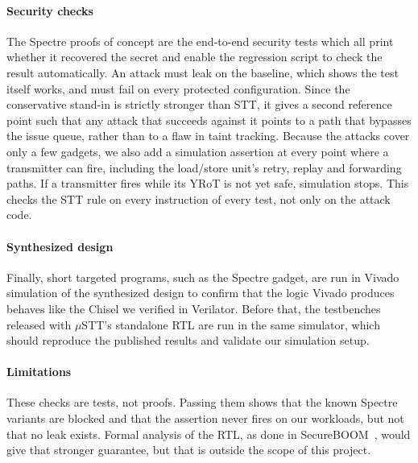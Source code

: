 \paragraph{Security checks}
The Spectre proofs of concept are the end-to-end security tests which all print
whether it recovered the secret and enable the regression script to check the
result automatically. An attack must leak on the baseline, which shows the
test itself works, and must fail on every protected configuration. Since the
conservative stand-in is strictly stronger than STT, it gives a second reference point 
such that any attack that succeeds against it points to a path that bypasses the issue queue, 
rather than to a flaw in taint tracking. Because the attacks cover only a few gadgets, 
we also add a simulation assertion at every point where a transmitter can fire, 
including the load/store unit's retry, replay and forwarding paths. If a transmitter 
fires while its YRoT is not yet safe, simulation stops. This checks the STT rule on every 
instruction of every test, not only on the attack code.

\paragraph{Synthesized design}
Finally, short targeted programs, such as the Spectre gadget, are run in Vivado
simulation of the synthesized design to confirm that the logic Vivado
produces behaves like the Chisel we verified in Verilator. Before that, the
testbenches released with $\mu$STT's standalone RTL are run in the same
simulator, which should reproduce the published results and validate our
simulation setup.

\paragraph{Limitations}
These checks are tests, not proofs. Passing them shows that the known Spectre
variants are blocked and that the assertion never fires on our workloads, but
not that no leak exists. Formal analysis of the RTL, as done in
SecureBOOM~\cite{Jauch:SecureBOOM:2023}, would give that stronger guarantee, but
that is outside the scope of this project.
